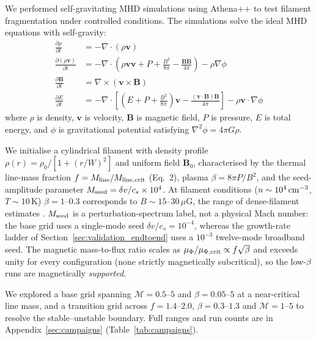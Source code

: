 \documentclass[usenatbib,twoside,twocolumn]{mnras}
\begin{document}
We performed self-gravitating MHD simulations using Athena++ \citep{Stone2020} to test filament fragmentation under controlled conditions. The simulations solve the ideal MHD equations with self-gravity:
\begin{align}
\frac{\partial \rho}{\partial t} &= -\nabla \cdot (\rho \mathbf{v}) \\
\frac{\partial (\rho \mathbf{v})}{\partial t} &= -\nabla \cdot \left(\rho \mathbf{v} \mathbf{v} + P + \frac{B^2}{8\pi} - \frac{\mathbf{B}\mathbf{B}}{4\pi}\right) - \rho \nabla \phi \\
\frac{\partial \mathbf{B}}{\partial t} &= \nabla \times (\mathbf{v} \times \mathbf{B}) \\
\frac{\partial E}{\partial t} &= -\nabla \cdot \left[(E + P + \frac{B^2}{8\pi})\mathbf{v} - \frac{(\mathbf{v} \cdot \mathbf{B})\mathbf{B}}{4\pi}\right] - \rho \mathbf{v} \cdot \nabla \phi
\end{align}
where $\rho$ is density, $\mathbf{v}$ is velocity, $\mathbf{B}$ is magnetic field, $P$ is pressure, $E$ is total energy, and $\phi$ is gravitational potential satisfying $\nabla^2 \phi = 4\pi G\rho$.

We initialise a cylindrical filament with density profile $\rho(r)=\rho_0/[1+(r/W)^2]$ and uniform field $\mathbf{B}_0$, characterised by the thermal line-mass fraction $f=M_{\rm line}/M_{\rm line,crit}$ (Eq.~2), plasma $\beta=8\pi P/B^2$, and the seed-amplitude parameter $M_{\rm seed}=\delta v/c_s\times10^{4}$. At filament conditions ($n\sim10^4\,{\rm cm^{-3}}$, $T\sim10$\,K) $\beta=1$--$0.3$ corresponds to $B\sim15$--$30\,\mu$G, the range of dense-filament estimates \citep{Crutcher2012}. $M_{\rm seed}$ is a perturbation-spectrum label, not a physical Mach number: the base grid uses a single-mode seed $\delta v/c_s=10^{-4}$, whereas the growth-rate ladder of Section~\ref{sec:validation_endtoend} uses a $10^{-3}$ twelve-mode broadband seed. The magnetic mass-to-flux ratio scales as $\mu_\Phi/\mu_{\Phi,\rm crit}\propto f\sqrt{\beta}$ and exceeds unity for every configuration (none strictly magnetically subcritical), so the low-$\beta$ runs are magnetically \emph{supported}.

We explored a base grid spanning $\mathcal{M}=0.5$--$5$ and $\beta=0.05$--$5$ at a near-critical line mass, and a transition grid across $f=1.4$--$2.0$, $\beta=0.3$--$1.3$ and $\mathcal{M}=1$--$5$ to resolve the stable--unstable boundary. Full ranges and run counts are in Appendix~\ref{sec:campaigns} (Table~\ref{tab:campaigns}).
\end{document}
